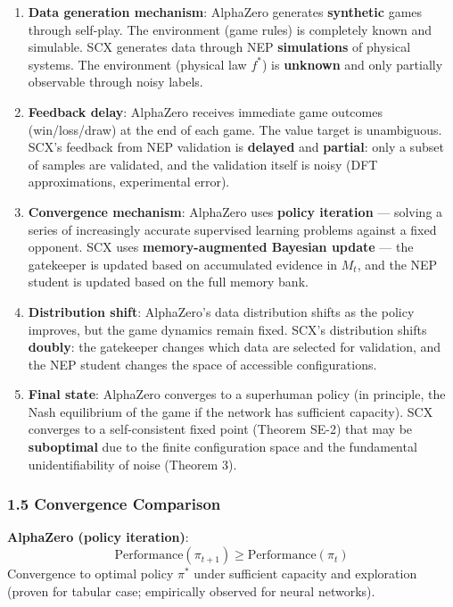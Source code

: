\documentclass[
  12pt,
]{ctexart}
\begin{document}
\begin{enumerate}
\def\labelenumi{\arabic{enumi}.}
\item
  \textbf{Data generation mechanism}: AlphaZero generates
  \textbf{synthetic} games through self-play. The environment (game
  rules) is completely known and simulable. SCX generates data through
  NEP \textbf{simulations} of physical systems. The environment
  (physical law \(f^*\)) is \textbf{unknown} and only partially
  observable through noisy labels.
\item
  \textbf{Feedback delay}: AlphaZero receives immediate game outcomes
  (win/loss/draw) at the end of each game. The value target is
  unambiguous. SCX's feedback from NEP validation is \textbf{delayed}
  and \textbf{partial}: only a subset of samples are validated, and the
  validation itself is noisy (DFT approximations, experimental error).
\item
  \textbf{Convergence mechanism}: AlphaZero uses \textbf{policy
  iteration} --- solving a series of increasingly accurate supervised
  learning problems against a fixed opponent. SCX uses
  \textbf{memory-augmented Bayesian update} --- the gatekeeper is
  updated based on accumulated evidence in \(M_t\), and the NEP student
  is updated based on the full memory bank.
\item
  \textbf{Distribution shift}: AlphaZero's data distribution shifts as
  the policy improves, but the game dynamics remain fixed. SCX's
  distribution shifts \textbf{doubly}: the gatekeeper changes which data
  are selected for validation, and the NEP student changes the space of
  accessible configurations.
\item
  \textbf{Final state}: AlphaZero converges to a superhuman policy (in
  principle, the Nash equilibrium of the game if the network has
  sufficient capacity). SCX converges to a self-consistent fixed point
  (Theorem SE-2) that may be \textbf{suboptimal} due to the finite
  configuration space and the fundamental unidentifiability of noise
  (Theorem 3).
\end{enumerate}

\subsubsection{1.5 Convergence Comparison}\label{convergence-comparison}

\textbf{AlphaZero (policy iteration)}:
\[\text{Performance}(\pi_{t+1}) \geq \text{Performance}(\pi_t)\]
Convergence to optimal policy \(\pi^*\) under sufficient capacity and
exploration (proven for tabular case; empirically observed for neural
networks).
\end{document}

